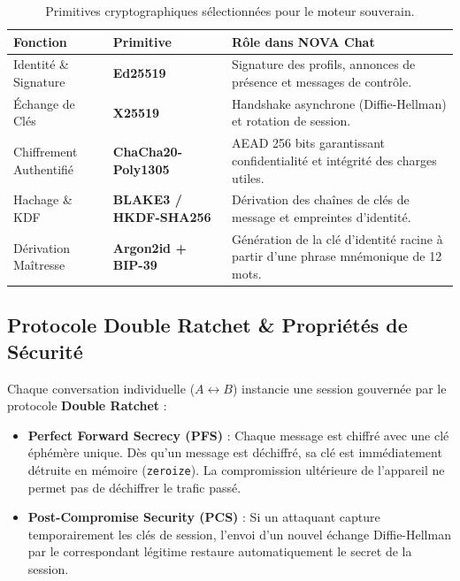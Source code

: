 \documentclass[11pt,a4paper]{article}
\begin{document}
\begin{table}[h!]
\centering
\begin{tabularx}{\textwidth}{|l|l|X|}
\hline
\rowcolor{novasurface2!20} \textbf{Fonction} & \textbf{Primitive} & \textbf{Rôle dans NOVA Chat} \\ \hline
Identité \& Signature & \textbf{Ed25519} & Signature des profils, annonces de présence et messages de contrôle. \\ \hline
Échange de Clés & \textbf{X25519} & Handshake asynchrone (Diffie-Hellman) et rotation de session. \\ \hline
Chiffrement Authentifié & \textbf{ChaCha20-Poly1305} & AEAD 256 bits garantissant confidentialité et intégrité des charges utiles. \\ \hline
Hachage \& KDF & \textbf{BLAKE3 / HKDF-SHA256} & Dérivation des chaînes de clés de message et empreintes d'identité. \\ \hline
Dérivation Maîtresse & \textbf{Argon2id + BIP-39} & Génération de la clé d'identité racine à partir d'une phrase mnémonique de 12 mots. \\ \hline
\end{tabularx}
\caption{Primitives cryptographiques sélectionnées pour le moteur souverain.}
\end{table}

\subsection{Protocole Double Ratchet \& Propriétés de Sécurité}
Chaque conversation individuelle ($A \leftrightarrow B$) instancie une session gouvernée par le protocole \textbf{Double Ratchet} :
\begin{itemize}
    \item \textbf{Perfect Forward Secrecy (PFS)} : Chaque message est chiffré avec une clé éphémère unique. Dès qu'un message est déchiffré, sa clé est immédiatement détruite en mémoire (\texttt{zeroize}). La compromission ultérieure de l'appareil ne permet pas de déchiffrer le trafic passé.
    \item \textbf{Post-Compromise Security (PCS)} : Si un attaquant capture temporairement les clés de session, l'envoi d'un nouvel échange Diffie-Hellman par le correspondant légitime restaure automatiquement le secret de la session.
\end{itemize}
\end{document}
